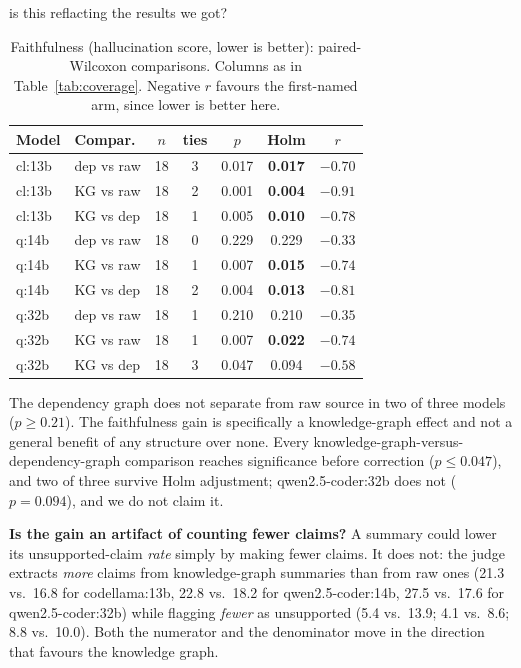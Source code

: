 is this reflacting the results we got?\documentclass[conference]{IEEEtran}
\begin{document}
\begin{table}[htbp]
\caption{Faithfulness (hallucination score, lower is better): paired-Wilcoxon comparisons.
Columns as in Table~\ref{tab:coverage}. Negative $r$ favours the first-named arm, since lower is
better here.}
\label{tab:faithfulness}
\centering
\footnotesize
\begin{tabular}{@{}p{0.85cm}p{1.25cm}ccccc@{}}
\toprule
Model & Compar. & $n$ & ties & $p$ & Holm & $r$ \\
\midrule
cl:13b & dep vs raw & 18 & 3 & 0.017 & \textbf{0.017} & $-0.70$ \\
cl:13b & KG vs raw & 18 & 2 & 0.001 & \textbf{0.004} & $-0.91$ \\
cl:13b & KG vs dep & 18 & 1 & 0.005 & \textbf{0.010} & $-0.78$ \\
q:14b & dep vs raw & 18 & 0 & 0.229 & 0.229 & $-0.33$ \\
q:14b & KG vs raw & 18 & 1 & 0.007 & \textbf{0.015} & $-0.74$ \\
q:14b & KG vs dep & 18 & 2 & 0.004 & \textbf{0.013} & $-0.81$ \\
q:32b & dep vs raw & 18 & 1 & 0.210 & 0.210 & $-0.35$ \\
q:32b & KG vs raw & 18 & 1 & 0.007 & \textbf{0.022} & $-0.74$ \\
q:32b & KG vs dep & 18 & 3 & 0.047 & 0.094 & $-0.58$ \\
\bottomrule
\end{tabular}
\end{table}

The dependency graph does not separate from raw source in two of three models ($p\ge0.21$). The
faithfulness gain is specifically a knowledge-graph effect and not a general benefit of any
structure over none. Every knowledge-graph-versus-dependency-graph comparison reaches
significance before correction ($p\le0.047$), and two of three survive Holm adjustment;
qwen2.5-coder:32b does not ($p=0.094$), and we do not claim it.

\textbf{Is the gain an artifact of counting fewer claims?} A summary could lower its
unsupported-claim \emph{rate} simply by making fewer claims. It does not: the judge extracts
\emph{more} claims from knowledge-graph summaries than from raw ones (21.3 vs.\ 16.8 for
codellama:13b, 22.8 vs.\ 18.2 for qwen2.5-coder:14b, 27.5 vs.\ 17.6 for qwen2.5-coder:32b) while
flagging \emph{fewer} as unsupported (5.4 vs.\ 13.9; 4.1 vs.\ 8.6; 8.8 vs.\ 10.0). Both the
numerator and the denominator move in the direction that favours the knowledge graph.
\end{document}
